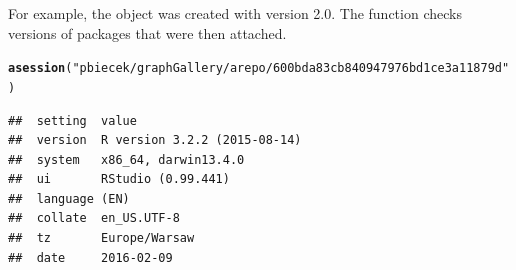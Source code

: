 \documentclass[nojss]{jss}\usepackage[]{graphicx}\usepackage[]{color}
\makeatletter
\newcommand{\hlstr}[1]{\textcolor[rgb]{0.192,0.494,0.8}{#1}}%
\newcommand{\hlstd}[1]{\textcolor[rgb]{0.345,0.345,0.345}{#1}}%
\newcommand{\hlkwd}[1]{\textcolor[rgb]{0.737,0.353,0.396}{\textbf{#1}}}%
\newenvironment{kframe}{%
 \def\at@end@of@kframe{}%
 \ifinner\ifhmode%
  \def\at@end@of@kframe{\end{minipage}}%
  \begin{minipage}{\columnwidth}%
 \fi\fi%
 \def\FrameCommand##1{\hskip\@totalleftmargin \hskip-\fboxsep
 \colorbox{shadecolor}{##1}\hskip-\fboxsep
     \hskip-\linewidth \hskip-\@totalleftmargin \hskip\columnwidth}%
 \MakeFramed {\advance\hsize-\width
   \@totalleftmargin\z@ \linewidth\hsize
   \@setminipage}}%
 {\par\unskip\endMakeFramed%
 \at@end@of@kframe}
\newenvironment{knitrout}{}{} %
\makeatother
\begin{document}
For example, the  object was created with  version 2.0. The  function checks versions of packages that were then attached.

\begin{knitrout}
\color{fgcolor}\begin{kframe}
\begin{alltt}
\hlkwd{asession}\hlstd{(}\hlstr{"pbiecek/graphGallery/arepo/600bda83cb840947976bd1ce3a11879d"}\hlstd{)}
\end{alltt}


{\ttfamily\noindent\itshape\color{messagecolor}{\#\# Session info ---------------------------------------------------------}}\begin{verbatim}
##  setting  value                       
##  version  R version 3.2.2 (2015-08-14)
##  system   x86_64, darwin13.4.0        
##  ui       RStudio (0.99.441)          
##  language (EN)                        
##  collate  en_US.UTF-8                 
##  tz       Europe/Warsaw               
##  date     2016-02-09
\end{verbatim}



\end{kframe}
\end{knitrout}
\end{document}
